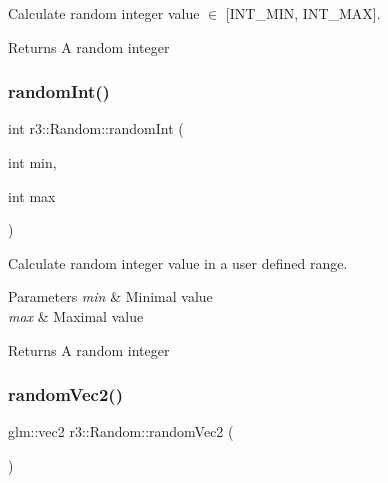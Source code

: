 Calculate random integer value $\in$ \mbox{[}I\+N\+T\+\_\+\+M\+IN, I\+N\+T\+\_\+\+M\+AX\mbox{]}. 

\begin{DoxyReturn}{Returns}
A random integer 
\end{DoxyReturn}
\mbox{\label{classr3_1_1_random_af98cf3295385b16f0369addeed024ce0}} 
\subsubsection{\texorpdfstring{random\+Int()}{randomInt()}\hspace{0.1cm}{\footnotesize\ttfamily [2/2]}}
{\footnotesize\ttfamily int r3\+::\+Random\+::random\+Int (\begin{DoxyParamCaption}\item[{int}]{min,  }\item[{int}]{max }\end{DoxyParamCaption})\hspace{0.3cm}{\ttfamily [static]}}



Calculate random integer value in a user defined range. 


\begin{DoxyParams}{Parameters}
{\em min} & Minimal value \\
\hline
{\em max} & Maximal value \\
\hline
\end{DoxyParams}
\begin{DoxyReturn}{Returns}
A random integer 
\end{DoxyReturn}
\mbox{\label{classr3_1_1_random_af52bb4270520c41c040d037ba88a8641}} 
\subsubsection{\texorpdfstring{random\+Vec2()}{randomVec2()}\hspace{0.1cm}{\footnotesize\ttfamily [1/3]}}
{\footnotesize\ttfamily glm\+::vec2 r3\+::\+Random\+::random\+Vec2 (\begin{DoxyParamCaption}{ }\end{DoxyParamCaption})\hspace{0.3cm}{\ttfamily [static]}}



